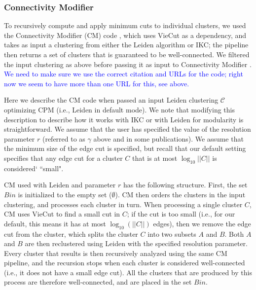 \documentclass[11pt]{article}   	%
\begin{document}
\subsubsection{Connectivity Modifier} To recursively compute and apply minimum cuts to individual clusters, we used the 
Connectivity Modifier (CM) code  \citep{cm2022},
 which uses VieCut \citep{Henzinger2018,Henzinger2019} as a dependency, and takes as input a clustering from either the Leiden algorithm or IKC; the pipeline then returns a set of clusters that is guaranteed to be
well-connected.
We filtered the input clustering as above before passing it as input to Connectivity Modifier \citep{cm-pypi}.
\textcolor{blue}{We need to make sure we use the correct citation and URLs for the code; right now we seem to have more than one URL for this, see above.}

Here we describe the CM code when passed an input  Leiden clustering $\mathcal{C}$  optimizing CPM (i.e., Leiden in default mode). We note that modifying this description to describe how it works with IKC or with Leiden for modularity is straightforward.
We assume that the user has specified the value of the resolution parameter $r$ (referred to as $\gamma$ above and in some publications).
We assume that the minimum size of the edge cut is specified, but recall that our default setting specifies that any edge cut for a cluster $C$ that is at most $ \log _{10} ||C||$ is 
considered` ``small".

CM used with Leiden and parameter $r$ has the following structure.
First, the set $Bin$ is initialized to the empty set  ($\emptyset$).
CM  then orders the clusters in the input clustering, and   processes each cluster in  turn.
When processing a single cluster $C$,
CM uses VieCut to find a small cut in $C$;  if the cut is too small (i.e., for our default, this means it has at most $\log_{10}(||C||)$ edges), then
we remove the edge cut from the cluster, which splits the cluster $C$ into two  subsets $A$ and $B$.
Both $A$ and $B$ are then reclustered using Leiden with the specified resolution parameter.
Every cluster that results is then recursively analyzed using the same CM pipeline, and the recursion stops when each cluster is considered well-connected (i.e., it does not have a small edge cut).
All the clusters that are produced by this process are therefore well-connected, and are placed in the set $Bin$.
\end{document}
